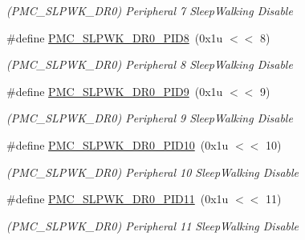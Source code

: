 \begin{DoxyCompactItemize}
\begin{DoxyCompactList}\small\item\em (P\+M\+C\+\_\+\+S\+L\+P\+W\+K\+\_\+\+D\+R0) Peripheral 7 Sleep\+Walking Disable \end{DoxyCompactList}\item 
\mbox{\label{group__SAMS70__PMC_ga67953823b700e33d87338bf8a352e4fc}} 
\#define \mbox{\hyperlink{group__SAMS70__PMC_ga67953823b700e33d87338bf8a352e4fc}{P\+M\+C\+\_\+\+S\+L\+P\+W\+K\+\_\+\+D\+R0\+\_\+\+P\+I\+D8}}~(0x1u $<$$<$ 8)
\begin{DoxyCompactList}\small\item\em (P\+M\+C\+\_\+\+S\+L\+P\+W\+K\+\_\+\+D\+R0) Peripheral 8 Sleep\+Walking Disable \end{DoxyCompactList}\item 
\mbox{\label{group__SAMS70__PMC_ga948db235629c0041ccb47c795aa37ffc}} 
\#define \mbox{\hyperlink{group__SAMS70__PMC_ga948db235629c0041ccb47c795aa37ffc}{P\+M\+C\+\_\+\+S\+L\+P\+W\+K\+\_\+\+D\+R0\+\_\+\+P\+I\+D9}}~(0x1u $<$$<$ 9)
\begin{DoxyCompactList}\small\item\em (P\+M\+C\+\_\+\+S\+L\+P\+W\+K\+\_\+\+D\+R0) Peripheral 9 Sleep\+Walking Disable \end{DoxyCompactList}\item 
\mbox{\label{group__SAMS70__PMC_gaf464ad11065a7306faad9bd70430b4ea}} 
\#define \mbox{\hyperlink{group__SAMS70__PMC_gaf464ad11065a7306faad9bd70430b4ea}{P\+M\+C\+\_\+\+S\+L\+P\+W\+K\+\_\+\+D\+R0\+\_\+\+P\+I\+D10}}~(0x1u $<$$<$ 10)
\begin{DoxyCompactList}\small\item\em (P\+M\+C\+\_\+\+S\+L\+P\+W\+K\+\_\+\+D\+R0) Peripheral 10 Sleep\+Walking Disable \end{DoxyCompactList}\item 
\mbox{\label{group__SAMS70__PMC_ga07869d56d5406e7d90408c1a23aa5e6c}} 
\#define \mbox{\hyperlink{group__SAMS70__PMC_ga07869d56d5406e7d90408c1a23aa5e6c}{P\+M\+C\+\_\+\+S\+L\+P\+W\+K\+\_\+\+D\+R0\+\_\+\+P\+I\+D11}}~(0x1u $<$$<$ 11)
\begin{DoxyCompactList}\small\item\em (P\+M\+C\+\_\+\+S\+L\+P\+W\+K\+\_\+\+D\+R0) Peripheral 11 Sleep\+Walking Disable \end{DoxyCompactList}\item 

\end{DoxyCompactItemize}
